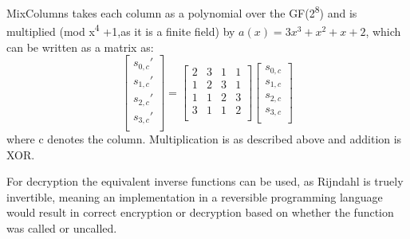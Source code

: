 \documentclass[a4paper]{article}
\begin{document}
MixColumns takes each column as a polynomial over the GF(2\textsuperscript{8}) and is multiplied (mod x\textsuperscript{4} +1,as it is a finite field) by \(a(x) = 3x^3 + x^2 + x + 2\), which can be written as a matrix as:
\[
\begin{bmatrix}
 s_{0,c}' \\
 s_{1,c}' \\
 s_{2,c}' \\
 s_{3,c}' \\
\end{bmatrix}=
\begin{bmatrix}
 2 & 3 & 1 & 1 \\
 1 & 2 & 3 & 1 \\
 1 & 1 & 2 & 3 \\
 3 & 1 & 1 & 2 \\
\end{bmatrix}
\begin{bmatrix}
 s_{0,c} \\
 s_{1,c} \\
 s_{2,c} \\
 s_{3,c} \\
\end{bmatrix}
\]
where c denotes the column. Multiplication is as described above and addition is XOR.

For decryption the equivalent inverse functions can be used, as Rijndahl is truely invertible, meaning an implementation in a reversible programming language would result in correct encryption or decryption based on whether the function was called or uncalled.
\end{document}
